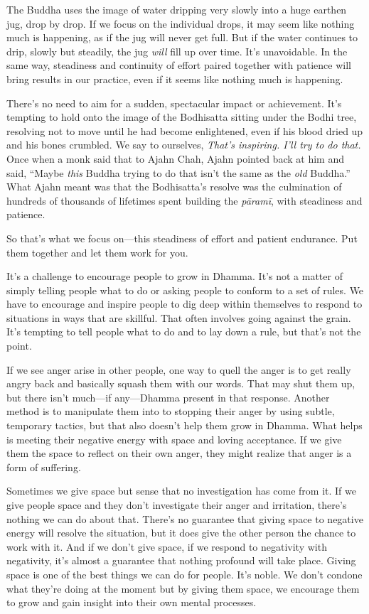 The Buddha uses the image of water dripping very slowly into a huge 
earthen jug, drop by drop. If we focus on the individual drops, it may 
seem like nothing much is happening, as if the jug will never get full. 
But if the water continues to drip, slowly but steadily, the jug 
\emph{will} fill up over time. It's unavoidable. In the same way, 
steadiness and continuity of effort paired together with patience will 
bring results in our practice, even if it seems like nothing much is 
happening.

There's no need to aim for a sudden, spectacular impact or achievement. 
It's tempting to hold onto the image of the Bodhisatta sitting under 
the Bodhi tree, resolving not to move until he had become enlightened, 
even if his blood dried up and his bones crumbled. We say to ourselves, 
\emph{That's inspiring. I'll try to do that.} Once when a monk said 
that to Ajahn Chah, Ajahn pointed back at him and said, ``Maybe 
\emph{this} Buddha trying to do that isn't the same as the \emph{old} 
Buddha.'' What Ajahn meant was that the Bodhisatta's resolve was the 
culmination of hundreds of thousands of lifetimes spent building the 
\emph{pāramī}, with steadiness and patience.

So that's what we focus on---this steadiness of effort and patient 
endurance. Put them together and let them work for you.


It's a challenge to encourage people to grow in Dhamma. It's not a 
matter of simply telling people what to do or asking people to conform 
to a set of rules. We have to encourage and inspire people to dig deep 
within themselves to respond to situations in ways that are skillful. 
That often involves going against the grain. It's tempting to tell 
people what to do and to lay down a rule, but that's not the point.

If we see anger arise in other people, one way to quell the anger is to 
get really angry back and basically squash them with our words. That 
may shut them up, but there isn't much---if any---Dhamma present in 
that response. Another method is to manipulate them into to stopping 
their anger by using subtle, temporary tactics, but that also doesn't 
help them grow in Dhamma. What helps is meeting their negative energy 
with space and loving acceptance. If we give them the space to reflect 
on their own anger, they might realize that anger is a form of 
suffering.

Sometimes we give space but sense that no investigation has come from 
it. If we give people space and they don't investigate their anger and 
irritation, there's nothing we can do about that. There's no guarantee 
that giving space to negative energy will resolve the situation, but it 
does give the other person the chance to work with it. And if we don't 
give space, if we respond to negativity with negativity, it's almost a 
guarantee that nothing profound will take place. Giving space is one of 
the best things we can do for people. It's noble. We don't condone what 
they're doing at the moment but by giving them space, we encourage them 
to grow and gain insight into their own mental processes.


